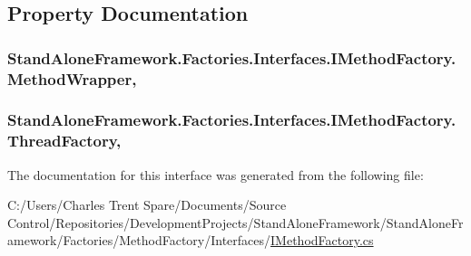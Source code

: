 \subsection{Property Documentation}
\hypertarget{interface_stand_alone_framework_1_1_factories_1_1_interfaces_1_1_i_method_factory_a2390dfd96f153491c70db92ff7e1b9e3}{
\subsubsection[{Method\+Wrapper}]{ Stand\+Alone\+Framework.\+Factories.\+Interfaces.\+I\+Method\+Factory.\+Method\+Wrapper\hspace{0.3cm}{\ttfamily [get]}, {\ttfamily [set]}}}\label{interface_stand_alone_framework_1_1_factories_1_1_interfaces_1_1_i_method_factory_a2390dfd96f153491c70db92ff7e1b9e3}
\hypertarget{interface_stand_alone_framework_1_1_factories_1_1_interfaces_1_1_i_method_factory_ac06213a945419bd5e1b34450410069a1}{
\subsubsection[{Thread\+Factory}]{ Stand\+Alone\+Framework.\+Factories.\+Interfaces.\+I\+Method\+Factory.\+Thread\+Factory\hspace{0.3cm}{\ttfamily [get]}, {\ttfamily [set]}}}\label{interface_stand_alone_framework_1_1_factories_1_1_interfaces_1_1_i_method_factory_ac06213a945419bd5e1b34450410069a1}


The documentation for this interface was generated from the following file\+:\begin{DoxyCompactItemize}
\item 
C\+:/\+Users/\+Charles Trent Spare/\+Documents/\+Source Control/\+Repositories/\+Development\+Projects/\+Stand\+Alone\+Framework/\+Stand\+Alone\+Framework/\+Factories/\+Method\+Factory/\+Interfaces/\hyperlink{_i_method_factory_8cs}{I\+Method\+Factory.\+cs}\end{DoxyCompactItemize}
